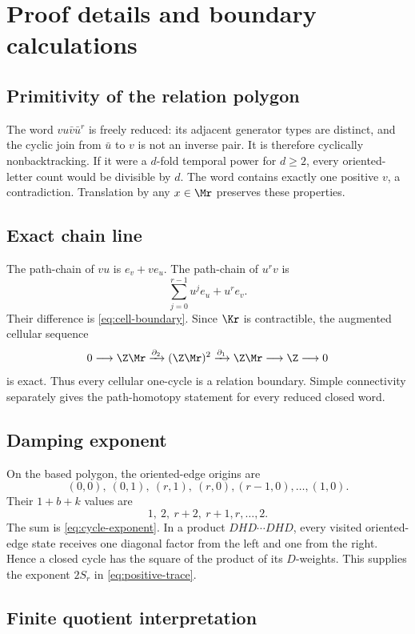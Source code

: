 \section{Proof details and boundary calculations}
\label{app:proofs}

\subsection{Primitivity of the relation polygon}

The word $vu\bar v\bar u^r$ is freely reduced: its adjacent generator types
are distinct, and the cyclic join from $\bar u$ to $v$ is not an inverse pair.
It is therefore cyclically nonbacktracking.  If it were a $d$-fold temporal
power for $d\ge2$, every oriented-letter count would be divisible by $d$.
The word contains exactly one positive $v$, a contradiction.  Translation by
any $x\in\Mr$ preserves these properties.

\subsection{Exact chain line}

The path-chain of $vu$ is $e_v+ve_u$.  The path-chain of $u^rv$ is
\[
\sum_{j=0}^{r-1}u^je_u+u^re_v.
\]
Their difference is \cref{eq:cell-boundary}.  Since $\Kr$ is contractible,
the augmented cellular sequence
\[
0\longrightarrow\Z\Mr\xrightarrow{\partial_2}(\Z\Mr)^2
\xrightarrow{\partial_1}\Z\Mr\longrightarrow\Z\longrightarrow0
\]
is exact.  Thus every cellular one-cycle is a relation boundary.  Simple
connectivity separately gives the path-homotopy statement for every reduced
closed word.

\subsection{Damping exponent}

On the based polygon, the oriented-edge origins are
\[
(0,0),\ (0,1),\ (r,1),\ (r,0),(r-1,0),\ldots,(1,0).
\]
Their $1+b+k$ values are
\[
1,\ 2,\ r+2,\ r+1,r,\ldots,2.
\]
The sum is \cref{eq:cycle-exponent}.  In a product
$DHD\cdots DHD$, every visited oriented-edge state receives one diagonal
factor from the left and one from the right.  Hence a closed cycle has the
square of the product of its $D$-weights.  This supplies the exponent $2S_r$
in \cref{eq:positive-trace}.

\subsection{Finite quotient interpretation}


